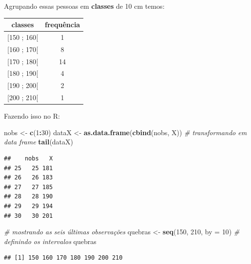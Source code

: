 \documentclass[
]{book}
\newenvironment{Shaded}{\begin{snugshade}}{\end{snugshade}}
\newcommand{\CommentTok}[1]{\textcolor[rgb]{0.56,0.35,0.01}{\textit{#1}}}
\newcommand{\DataTypeTok}[1]{\textcolor[rgb]{0.13,0.29,0.53}{#1}}
\newcommand{\DecValTok}[1]{\textcolor[rgb]{0.00,0.00,0.81}{#1}}
\newcommand{\KeywordTok}[1]{\textcolor[rgb]{0.13,0.29,0.53}{\textbf{#1}}}
\newcommand{\NormalTok}[1]{#1}
\newcommand{\OperatorTok}[1]{\textcolor[rgb]{0.81,0.36,0.00}{\textbf{#1}}}
\newcommand{\OtherTok}[1]{\textcolor[rgb]{0.56,0.35,0.01}{#1}}
\newcommand{\StringTok}[1]{\textcolor[rgb]{0.31,0.60,0.02}{#1}}
\begin{document}
Agrupando essas pessoas em \textbf{classes} de 10 cm temos:

\begin{longtable}[]{@{}cc@{}}
\toprule
classes & frequência\tabularnewline
\midrule
\endhead
{[}150 ; 160{[} & 1\tabularnewline
{[}160 ; 170{[} & 8\tabularnewline
{[}170 ; 180{[} & 14\tabularnewline
{[}180 ; 190{[} & 4\tabularnewline
{[}190 ; 200{[} & 2\tabularnewline
{[}200 ; 210{[} & 1\tabularnewline
\bottomrule
\end{longtable}

Fazendo isso no R:

\begin{Shaded}
\begin{Highlighting}[]
\NormalTok{nobs <-}\StringTok{ }\KeywordTok{c}\NormalTok{(}\DecValTok{1}\OperatorTok{:}\DecValTok{30}\NormalTok{)}
\NormalTok{dataX <-}\StringTok{ }\KeywordTok{as.data.frame}\NormalTok{(}\KeywordTok{cbind}\NormalTok{(nobs, X))}
\CommentTok{# transformando em data frame}
\KeywordTok{tail}\NormalTok{(dataX)}
\end{Highlighting}
\end{Shaded}

\begin{verbatim}
##    nobs   X
## 25   25 181
## 26   26 183
## 27   27 185
## 28   28 190
## 29   29 194
## 30   30 201
\end{verbatim}

\begin{Shaded}
\begin{Highlighting}[]
\CommentTok{# mostrando as seis últimas observações}
\NormalTok{quebras <-}\StringTok{ }\KeywordTok{seq}\NormalTok{(}\DecValTok{150}\NormalTok{, }\DecValTok{210}\NormalTok{, }\DataTypeTok{by =} \DecValTok{10}\NormalTok{)}
\CommentTok{# definindo os intervalos}
\NormalTok{quebras}
\end{Highlighting}
\end{Shaded}

\begin{verbatim}
## [1] 150 160 170 180 190 200 210
\end{verbatim}

\begin{Shaded}
\end{Shaded}
\end{document}

